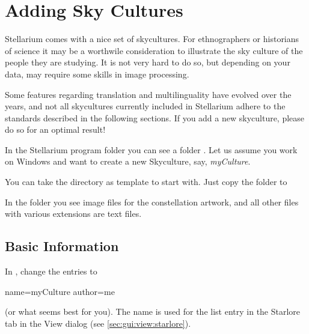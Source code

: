 

\chapter{Adding Sky Cultures}
\label{ch:SkyCultures}

Stellarium comes with a nice set of skycultures. For ethnographers or
historians of science it may be a worthwile consideration to
illustrate the sky culture of the people they are studying. It is not
very hard to do so, but depending on your data, may require some
skills in image processing. 

Some features regarding translation and multilinguality have evolved
over the years, and not all skycultures currently included in
Stellarium adhere to the standards described in the following
sections. If you add a new skyculture, please do so for an optimal
result!




In the Stellarium program folder you can see a folder
. Let us assume you work on Windows and want to create a
new Skyculture, say, \emph{myCulture}.


You can take the  directory as template to start with. Just copy the folder 
 to

In the folder you see image files for the constellation artwork, and all
other files with various extensions are text files. 


\section{Basic Information}
\label{sec:skycultures:info.ini}


In , change the entries to 
\begin{configfile}
[info]
name=myCulture
author=me
\end{configfile}

\noindent (or what seems best for you). The name is used for the list entry in
the Starlore tab in the View dialog (see \ref{sec:gui:view:starlore}).


